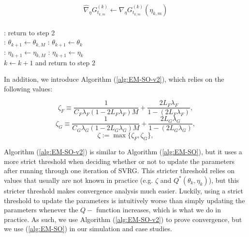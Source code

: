 \begin{algorithm}
\begin{algorithmic}[1]
\begin{gather}
            \widehat \nabla_\eta G_{t_{k,m}}^{(k)} \gets \nabla_\eta G_{t_{k,m}}^{(k)}(\eta_{k,m})
        \end{gather}
    \EndIf
\EndFor
%
\\
%
:
    \State return to step 2 
\EndIf
%
\\
%
:
    \State $\theta_{k+1} \gets \theta_{k,M}$
\Else:
    \State $\theta_{k+1} \gets \theta_k$
\EndIf
%
\\
%
:
    \State $\eta_{k+1} \gets \eta_{k,M}$
\Else:
    \State $\eta_{k+1} \gets \eta_k$
\EndIf
%
\\
%
\State $k \gets k+1$ and return to step 2
\end{algorithmic}
\end{algorithm}


In addition, we introduce Algorithm (\ref{alg:EM-SO-v2}), which relies on the following values:

$$\zeta_F \equiv \frac{1}{C_F \lambda_F(1-2L_F\lambda_F)M} + \frac{2L_F\lambda_F}{1-(2L_F\lambda_F)},$$ 
$$\zeta_G \equiv \frac{1}{C_G \lambda_G(1-2L_G\lambda_G)M} + \frac{2L_G\lambda_G}{1-(2L_G\lambda_G)},$$
$$\zeta := \max\{\zeta_F,\zeta_G\},$$

Algorithm (\ref{alg:EM-SO-v2}) is similar to Algorithm (\ref{alg:EM-SO}), but it uses a more strict threshold when deciding whether or not to update the parameters after running through one iteration of SVRG. This stricter threshold relies on values that usually are not known in practice (e.g. $\zeta$ and $Q^*(\theta_k,\eta_k)$), but this stricter threshold makes convergence analysis much easier. Luckily, using a strict threshold to update the parameters is intuitively worse than simply updating the parameters whenever the $Q-$ function increases, which is what we do in practice. As such, we use Algorithm (\ref{alg:EM-SO-v2}) to prove convergence, but we use (\ref{alg:EM-SO}) in our simulation and case studies.


